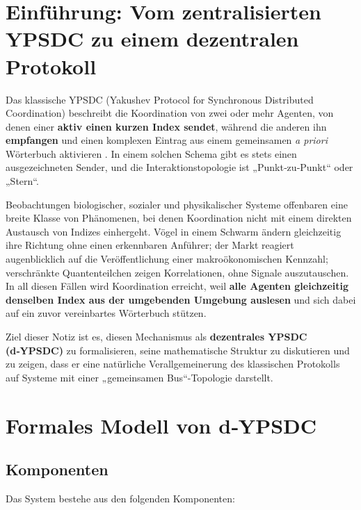 \documentclass[12pt,a4paper]{article}
\begin{document}
	\tableofcontents
	\newpage
	
	\section{Einführung: Vom zentralisierten YPSDC zu einem dezentralen Protokoll}
	
	Das klassische YPSDC (Yakushev Protocol for Synchronous Distributed Coordination) beschreibt die Koordination von zwei oder mehr Agenten, von denen einer \textbf{aktiv einen kurzen Index sendet}, während die anderen ihn \textbf{empfangen} und einen komplexen Eintrag aus einem gemeinsamen \emph{a priori} Wörterbuch aktivieren \cite{YUCT}. In einem solchen Schema gibt es stets einen ausgezeichneten Sender, und die Interaktionstopologie ist „Punkt‑zu‑Punkt“ oder „Stern“.
	
	Beobachtungen biologischer, sozialer und physikalischer Systeme offenbaren eine breite Klasse von Phänomenen, bei denen Koordination nicht mit einem direkten Austausch von Indizes einhergeht. Vögel in einem Schwarm ändern gleichzeitig ihre Richtung ohne einen erkennbaren Anführer; der Markt reagiert augenblicklich auf die Veröffentlichung einer makroökonomischen Kennzahl; verschränkte Quantenteilchen zeigen Korrelationen, ohne Signale auszutauschen. In all diesen Fällen wird Koordination erreicht, weil \textbf{alle Agenten gleichzeitig denselben Index aus der umgebenden Umgebung auslesen} und sich dabei auf ein zuvor vereinbartes Wörterbuch stützen.
	
	Ziel dieser Notiz ist es, diesen Mechanismus als \textbf{dezentrales YPSDC (d‑YPSDC)} zu formalisieren, seine mathematische Struktur zu diskutieren und zu zeigen, dass er eine natürliche Verallgemeinerung des klassischen Protokolls auf Systeme mit einer „gemeinsamen Bus“-Topologie darstellt.
	
	\section{Formales Modell von d‑YPSDC}
	
	\subsection{Komponenten}
	
	Das System bestehe aus den folgenden Komponenten:
	
\end{document}
